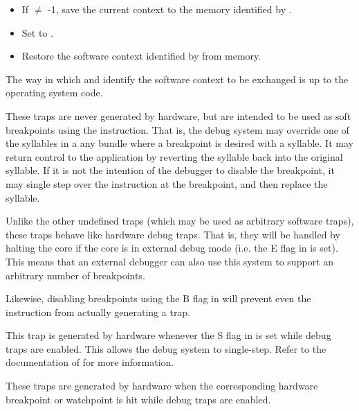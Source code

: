 \begin{itemize}
\item If  $\neq$ -1, save the current context to the memory
identified by .
\item Set  to .
\item Restore the software context identified by  from memory.
\end{itemize}

The way in which  and  identify the software context to be
exchanged is up to the operating system code.


\debug{}

These traps are never generated by hardware, but are intended to be used as soft
breakpoints using the  instruction. That is, the debug system may
override one of the syllables in a any bundle where a breakpoint is desired with
a  syllable. It may return control to the application by reverting
the  syllable back into the original syllable. If it is not the
intention of the debugger to disable the breakpoint, it may single step over
the instruction at the breakpoint, and then replace the  syllable.

Unlike the other undefined traps (which may be used as arbitrary software
traps), these traps behave like hardware debug traps. That is, they will be
handled by halting the core if the core is in external debug mode (i.e. the E
flag in  is set). This means that an external debugger can also use
this system to support an arbitrary number of breakpoints.

Likewise, disabling breakpoints using the B flag in  will prevent even
the  instruction from actually generating a trap.



This trap is generated by hardware whenever the S flag in  is set
while debug traps are enabled. This allows the debug system to single-step.
Refer to the documentation of  for more information.


\debug{}

These traps are generated by hardware when the corresponding hardware breakpoint
or watchpoint is hit while debug traps are enabled.

